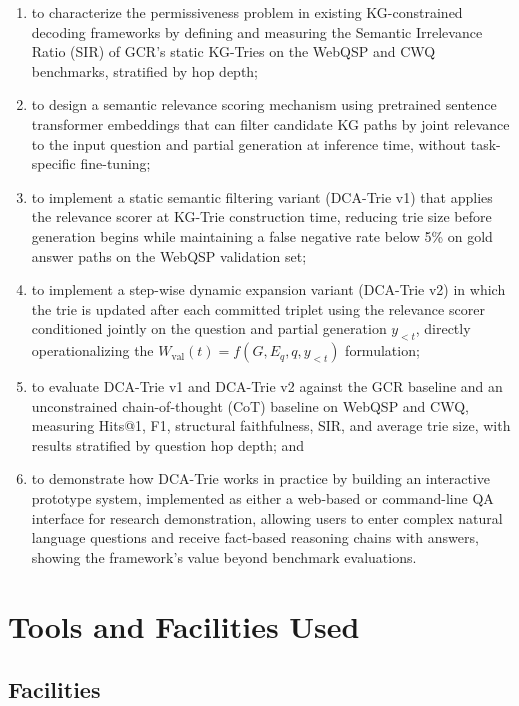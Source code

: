 \begin{enumerate}[label=\roman*.]
  \item to characterize the permissiveness problem in existing KG-constrained decoding frameworks by defining and measuring the Semantic Irrelevance Ratio (SIR) of GCR's static KG-Tries on the WebQSP and CWQ benchmarks, stratified by hop depth;
  \item to design a semantic relevance scoring mechanism using pretrained sentence transformer embeddings \citep{reimers2019sbert} that can filter candidate KG paths by joint relevance to the input question and partial generation at inference time, without task-specific fine-tuning;
  \item to implement a static semantic filtering variant (DCA-Trie v1) that applies the relevance scorer at KG-Trie construction time, reducing trie size before generation begins while maintaining a false negative rate below 5\% on gold answer paths on the WebQSP validation set;
  \item to implement a step-wise dynamic expansion variant (DCA-Trie v2) in which the trie is updated after each committed triplet using the relevance scorer conditioned jointly on the question and partial generation $y_{<t}$, directly operationalizing the $W_{\mathrm{val}}(t) = f(G, E_q, q, y_{<t})$ formulation;
  \item to evaluate DCA-Trie v1 and DCA-Trie v2 against the GCR baseline and an unconstrained chain-of-thought (CoT) baseline on WebQSP and CWQ, measuring Hits@1, F1, structural faithfulness, SIR, and average trie size, with results stratified by question hop depth; and
  \item to demonstrate how DCA-Trie works in practice by building an interactive prototype system, implemented as either a web-based or command-line QA interface for research demonstration, allowing users to enter complex natural language questions and receive fact-based reasoning chains with answers, showing the framework's value beyond benchmark evaluations.
\end{enumerate}

\section{Tools and Facilities Used}

\subsection{Facilities}

